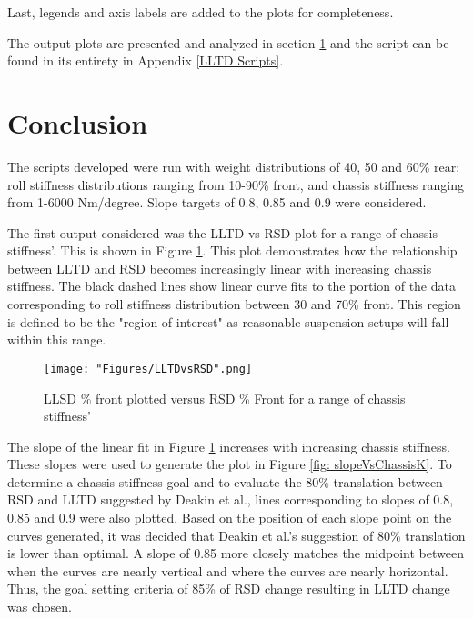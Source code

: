 \documentclass[a4paper]{article}
\numberwithin{equation}{section}
\begin{document}
Last, legends and axis labels are added to the plots for completeness.

The output plots are presented and analyzed in section \ref{Conclusion} and the script can be found in its entirety in Appendix \ref{LLTD Scripts}.

\section{Conclusion} \label{Conclusion}
The scripts developed were run with weight distributions of 40, 50 and 60\% rear; roll stiffness distributions ranging from 10-90\% front, and chassis stiffness ranging from 1-6000 Nm/degree. Slope targets of 0.8, 0.85 and 0.9 were considered.

The first output considered was the LLTD vs RSD plot for a range of chassis stiffness'. This is shown in Figure \ref{fig: LLTDvsRSD}. This plot demonstrates how the relationship between LLTD and RSD becomes increasingly linear with increasing chassis stiffness. The black dashed lines show linear curve fits to the portion of the data corresponding to roll stiffness distribution between 30 and 70\% front. This region is defined to be the "region of interest" as reasonable suspension setups will fall within this range.

\begin{figure}[h]
	\begin{center}
		\texttt{[image: "Figures/LLTDvsRSD".png]}
	\end{center}
	
	\caption{LLSD \% front plotted versus RSD \% Front for a range of chassis stiffness'}
	\label{fig: LLTDvsRSD}
\end{figure}

The slope of the linear fit in Figure \ref{fig: LLTDvsRSD} increases with increasing chassis stiffness. These slopes were used to generate the plot in Figure \ref{fig: slopeVsChassisK}. To determine a chassis stiffness goal and to evaluate the 80\% translation between RSD and LLTD suggested by Deakin et al., lines corresponding to slopes of 0.8, 0.85 and 0.9 were also plotted. Based on the position of each slope point on the curves generated, it was decided that Deakin et al.'s suggestion of 80\% translation is lower than optimal. A slope of 0.85 more closely matches the midpoint between when the curves are nearly vertical and where the curves are nearly horizontal. Thus, the goal setting criteria of 85\% of RSD change resulting in LLTD change was chosen.
\end{document}

